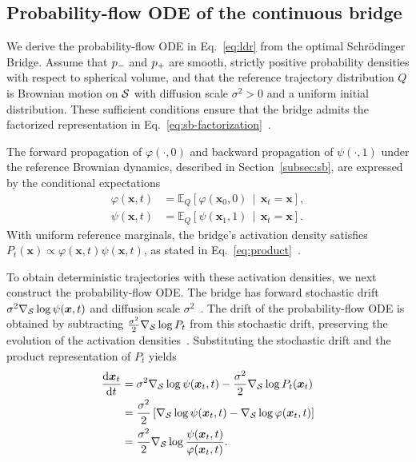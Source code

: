 \subsection{Probability-flow ODE of the continuous bridge}
\label{apx:static}

We derive the probability-flow ODE in Eq.~\eqref{eq:ldr} from the optimal Schr\"{o}dinger Bridge. Assume that $p_{-}$ and $p_{+}$ are smooth, strictly positive probability densities with respect to spherical volume, and that the reference trajectory distribution $Q$ is Brownian motion on $\mathcal{S}$ with diffusion scale $\sigma^2>0$ and a uniform initial distribution. These sufficient conditions ensure that the bridge admits the factorized representation in Eq.~\eqref{eq:sb-factorization}~\citep{leonard2013survey}.

The forward propagation of $\varphi(\cdot,0)$ and backward propagation of $\psi(\cdot,1)$ under the reference Brownian dynamics, described in Section~\ref{subsec:sb}, are expressed by the conditional expectations
\[
\begin{aligned}
\varphi(\boldsymbol{x},t)
&=\mathbb{E}_{Q}\!\left[
\varphi(\boldsymbol{x}_0,0)
\,\middle|\,
\boldsymbol{x}_t=\boldsymbol{x}
\right],\\
\psi(\boldsymbol{x},t)
&=\mathbb{E}_{Q}\!\left[
\psi(\boldsymbol{x}_1,1)
\,\middle|\,
\boldsymbol{x}_t=\boldsymbol{x}
\right].
\end{aligned}
\]
With uniform reference marginals, the bridge's activation density satisfies $P_t(\boldsymbol{x})\propto\varphi(\boldsymbol{x},t)\psi(\boldsymbol{x},t)$, as stated in Eq.~\eqref{eq:product}~\citep{leonard2013survey}.

To obtain deterministic trajectories with these activation densities, we next construct the probability-flow ODE. The bridge has forward stochastic drift $\sigma^2\nabla_{\mathcal{S}}\log\psi(\boldsymbol{x},t)$ and diffusion scale $\sigma^2$~\citep{leonard2013survey}. The drift of the probability-flow ODE is obtained by subtracting $\frac{\sigma^2}{2}\nabla_{\mathcal{S}}\log P_t$ from this stochastic drift, preserving the evolution of the activation densities~\citep{song2020score, de2022riemannian}. Substituting the stochastic drift and the product representation of $P_t$ yields
\[
\begin{aligned}
\frac{\mathrm{d}\boldsymbol{x}_t}{\mathrm{d}t}
&=\sigma^2\nabla_{\mathcal{S}}\log\psi(\boldsymbol{x}_t,t)
-\frac{\sigma^2}{2}\nabla_{\mathcal{S}}\log P_t(\boldsymbol{x}_t)\\
&=\frac{\sigma^2}{2}
\left[
\nabla_{\mathcal{S}}\log\psi(\boldsymbol{x}_t,t)
-\nabla_{\mathcal{S}}\log\varphi(\boldsymbol{x}_t,t)
\right]\\
&=\frac{\sigma^2}{2}\nabla_{\mathcal{S}}
\log\frac{\psi(\boldsymbol{x}_t,t)}
{\varphi(\boldsymbol{x}_t,t)}.
\end{aligned}
\]


